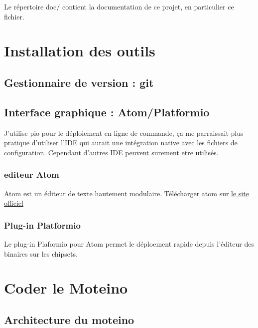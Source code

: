 \documentclass{report}
\begin{document}
Le répertoire doc/ contient la documentation de ce projet, en particulier ce fichier.

\chapter{Installation des outils}

\section{Gestionnaire de version : git}

\section{Interface graphique : Atom/Platformio}

J'utilise pio pour le déploiement en ligne de commande, ça me parraissait plus pratique d'utiliser l'IDE qui aurait une intégration native avec les fichiers de configuration. Cependant d'autres IDE peuvent surement etre utilisés.

\subsection{editeur Atom}

Atom est un éditeur de texte hautement modulaire.
Télécharger atom sur \href{https://atom.io/}{le site officiel}

\subsection{Plug-in Platformio}

Le plug-in Plaformio pour Atom permet le déploement rapide depuis l'éditeur des binaires sur les chipsets.

\chapter{Coder le Moteino}

\section{Architecture du moteino}
\end{document}
